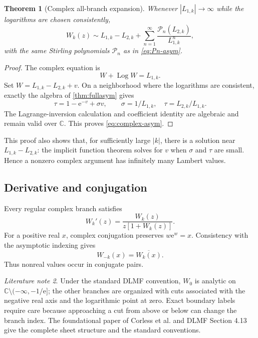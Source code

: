 \documentclass[11pt]{article}
\newtheorem{theorem}{Theorem}[section]
\theoremstyle{remark}
\newtheorem{literaturenote}[theorem]{Literature note}
\newcommand{\ee}{\mathrm e}
\newcommand{\Log}{\operatorname{Log}}
\newcommand{\abs}[1]{\left|#1\right|}
\begin{document}
\begin{theorem}[Complex all-branch expansion]\label{thm:complex-asym}
Whenever \(\abs{L_{1,k}}\to\infty\) while the logarithms are chosen
consistently,
\begin{equation}\label{eq:complex-asym}
 W_k(z)\sim L_{1,k}-L_{2,k}
 +\sum_{n=1}^{\infty}
 \frac{\mathcal P_n(L_{2,k})}{L_{1,k}^n},
\end{equation}
with the same Stirling polynomials \(\mathcal P_n\) as in
\eqref{eq:Pn-asym}.
\end{theorem}

\begin{proof}
The complex equation is
\[
       W+\Log W=L_{1,k}.
\]
Set \(W=L_{1,k}-L_{2,k}+v\).  On a neighborhood where the logarithms are
consistent, exactly the algebra of \cref{thm:fullasym} gives
\[
       \tau=1-\ee^{-v}+\sigma v,\qquad
       \sigma=1/L_{1,k},\quad \tau=L_{2,k}/L_{1,k}.
\]
The Lagrange-inversion calculation and coefficient identity are algebraic
and remain valid over \(\mathbb C\).  This proves
\eqref{eq:complex-asym}.
\end{proof}

This proof also shows that, for sufficiently large \(\abs{k}\), there is a
solution near \(L_{1,k}-L_{2,k}\): the implicit function theorem solves for
\(v\) when \(\sigma\) and \(\tau\) are small.  Hence a nonzero complex
argument has infinitely many Lambert values.

\subsection{Derivative and conjugation}

Every regular complex branch satisfies
\[
       W_k'(z)=\frac{W_k(z)}{z[1+W_k(z)]}.
\]
For a positive real \(x\), complex conjugation preserves
\(w\ee^w=x\).  Consistency with the asymptotic indexing gives
\[
       W_{-k}(x)=\overline{W_k(x)}.
\]
Thus nonreal values occur in conjugate pairs.

\begin{literaturenote}
Under the standard DLMF convention, \(W_0\) is analytic on
\(\mathbb C\setminus(-\infty,-1/\ee]\); the other branches are organized
with cuts associated with the negative real axis and the logarithmic point
at zero.  Exact boundary labels require care because approaching a cut from
above or below can change the branch index.  The foundational paper of
Corless et al. and DLMF Section 4.13 give the complete sheet structure and
the standard conventions.
\end{literaturenote}
\end{document}
